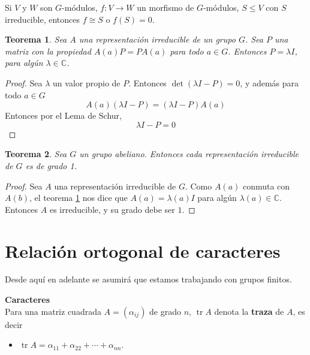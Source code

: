 \documentclass[12pt]{book}
\DeclareMathOperator{\tr}{tr}
\newtheorem{theorem}{Teorema}[section]
\theoremstyle{definition}
\newcounter{in}
\newcounter{ini}
\begin{document}
\begin{mdframed}
  Si $V$ y $W$ son $G$-módulos, $f \colon V \to W$ un morfismo de
  $G$-módulos, $S \leq V$ con $S$ irreducible, entonces $f \cong S$ o
  $f(S) = 0$.
\end{mdframed}
\begin{theorem}
  \label{t3_2}
  Sea $A$ una representación irreducible de un grupo $G$. Sea $P$ una
  matriz con la propiedad $A(a)P=PA(a)$ para todo $a \in G$. Entonces
  $P=\lambda I$, para algún $\lambda \in \mathbb{C}$.
\end{theorem}
\begin{proof}
  Sea $\lambda$ un valor propio de $P$. Entonces
  $\det(\lambda I - P)=0$, y además para todo $a \in G$
  \begin{equation}
    \label{eq:20}
    A(a)(\lambda I - P)=(\lambda I - P)A(a)
  \end{equation}
  Entonces por el Lema de Schur,
  \begin{equation}
    \label{eq:21}
    \lambda I-P=0
  \end{equation}
\end{proof}

\begin{theorem}
  \label{t3_3}
  Sea $G$ un grupo abeliano. Entonces cada
representación irreducible de $G$ es de grado 1.
\end{theorem}

\begin{proof}
  Sea $A$ una representación irreducible de $G$. Como $A(a)$ conmuta
  con $A(b)$, el teorema \ref{t3_2} nos dice que $A(a)=\lambda(a) I$
  para algún $\lambda(a) \in \mathbb{C}$. Entonces $A$ es irreducible,
  y su grado debe ser $1$.
\end{proof}

\section{Relación ortogonal de caracteres}
\label{sec:roc}
Desde aquí en adelante se asumirá que estamos trabajando con grupos
finitos.

\textbf{Caracteres}\\
Para una matriz cuadrada $A=(\alpha_{ij})$ de grado
$n$, $\tr A$ denota la \textbf{traza} de $A$, es decir
\begin{itemize}
  \item $\tr A= \alpha_{11}+ \alpha_{22} + \cdots + \alpha_{nn}$.
  \end{itemize}
\end{document}
